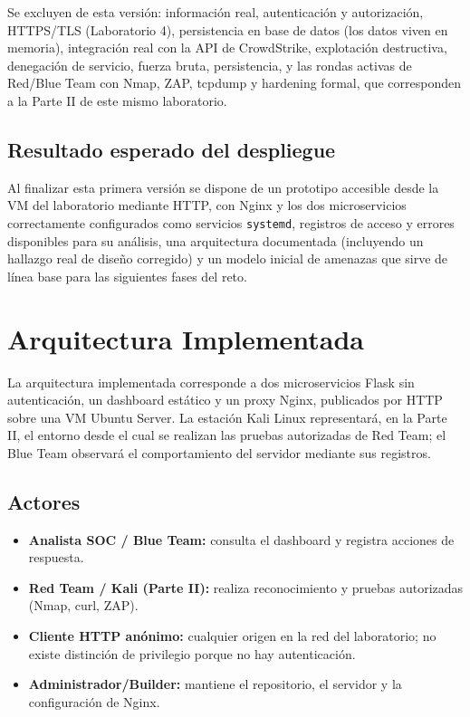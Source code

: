 \documentclass[journal]{IEEEtran}
\begin{document}
Se excluyen de esta versión: información real, autenticación y autorización,
HTTPS/TLS (Laboratorio 4), persistencia en base de datos (los datos viven en
memoria), integración real con la API de CrowdStrike, explotación destructiva,
denegación de servicio, fuerza bruta, persistencia, y las rondas activas de
Red/Blue Team con Nmap, ZAP, tcpdump y hardening formal, que corresponden a la
Parte II de este mismo laboratorio.

\subsection{Resultado esperado del despliegue}

Al finalizar esta primera versión se dispone de un prototipo accesible desde
la VM del laboratorio mediante HTTP, con Nginx y los dos microservicios
correctamente configurados como servicios \texttt{systemd}, registros de
acceso y errores disponibles para su análisis, una arquitectura documentada
(incluyendo un hallazgo real de diseño corregido) y un modelo inicial de
amenazas que sirve de línea base para las siguientes fases del reto.

\section{Arquitectura Implementada}

La arquitectura implementada corresponde a dos microservicios Flask sin
autenticación, un dashboard estático y un proxy Nginx, publicados por HTTP
sobre una VM Ubuntu Server. La estación Kali Linux representará, en la
Parte II, el entorno desde el cual se realizan las pruebas autorizadas de
Red Team; el Blue Team observará el comportamiento del servidor mediante sus
registros.

\subsection{Actores}

\begin{itemize}
    \item \textbf{Analista SOC / Blue Team:} consulta el dashboard y registra
    acciones de respuesta.
    \item \textbf{Red Team / Kali (Parte II):} realiza reconocimiento y
    pruebas autorizadas (Nmap, curl, ZAP).
    \item \textbf{Cliente HTTP anónimo:} cualquier origen en la red del
    laboratorio; no existe distinción de privilegio porque no hay
    autenticación.
    \item \textbf{Administrador/Builder:} mantiene el repositorio, el servidor
    y la configuración de Nginx.
\end{itemize}
\end{document}
